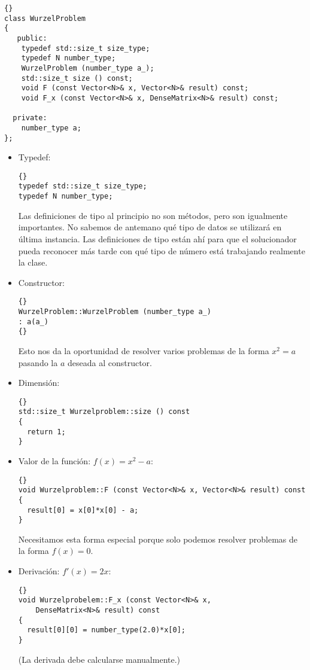 {\footnotesize{\begin{lstlisting}{}
class WurzelProblem
{
   public:
    typedef std::size_t size_type;
    typedef N number_type;
    WurzelProblem (number_type a_);
    std::size_t size () const;
    void F (const Vector<N>& x, Vector<N>& result) const;
    void F_x (const Vector<N>& x, DenseMatrix<N>& result) const;

  private:
    number_type a;
};
\end{lstlisting}}}


\begin{itemize}
\item Typedef:

  {\footnotesize{\begin{lstlisting}{}
typedef std::size_t size_type;
typedef N number_type;
\end{lstlisting}}}

Las definiciones de tipo al principio no son métodos, pero son igualmente importantes. 
No sabemos de antemano qué tipo de datos se utilizará en última instancia. Las definiciones 
de tipo están ahí para que el solucionador pueda reconocer más tarde con qué tipo de 
número está trabajando realmente la clase.


\item Constructor:
  {\footnotesize{\begin{lstlisting}{}
WurzelProblem::WurzelProblem (number_type a_)
: a(a_)
{}
\end{lstlisting}}}

Esto nos da la oportunidad de resolver varios problemas de la forma 
$x^2=a$ pasando la $a$ deseada al constructor.

\item Dimensión:

  {\footnotesize{\begin{lstlisting}{}
std::size_t Wurzelproblem::size () const
{
  return 1;
}
\end{lstlisting}}}

\item Valor de la función: $f(x)=x^2-a$:

  {\footnotesize{\begin{lstlisting}{}
void Wurzelproblem::F (const Vector<N>& x, Vector<N>& result) const
{
  result[0] = x[0]*x[0] - a;
}
\end{lstlisting}}}

Necesitamos esta forma especial porque solo podemos resolver problemas de la forma $f (x) = 0$.


\item Derivación: $f'(x)=2x$:
  {\footnotesize{\begin{lstlisting}{}
void Wurzelprobelem::F_x (const Vector<N>& x,
    DenseMatrix<N>& result) const
{
  result[0][0] = number_type(2.0)*x[0];
}
\end{lstlisting}}}
(La derivada debe calcularse manualmente.)
\end{itemize}

